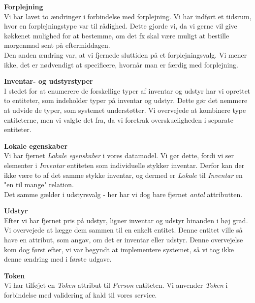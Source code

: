 \textbf{Forplejning}
\\Vi har lavet to ændringer i forbindelse med forplejning. Vi har indført et tidsrum, hvor en forplejningstype var til rådighed. Dette gjorde vi, da vi gerne vil give køkkenet mulighed for at bestemme, om det fx skal være muligt at bestille morgenmad sent på eftermiddagen.
\\Den anden ændring var, at vi fjernede sluttiden på et forplejningsvalg. Vi mener ikke, det er nødvendigt at specificere, hvornår man er færdig med forplejning.

\textbf{Inventar- og udstyrstyper}
\\I stedet for at enumerere de forskellige typer af inventar og udstyr har vi oprettet to entiteter, som indeholder typer på inventar og udstyr. Dette gør det nemmere at udvide de typer, som systemet understøtter. Vi overvejede at kombinere type entiteterne, men vi valgte det fra, da vi foretrak overskueligheden i separate entiteter.

\textbf{Lokale egenskaber}
\\Vi har fjernet \textit{Lokale egenskaber} i vores datamodel. Vi gør dette, fordi vi ser elementer i \textit{Inventar} entiteten som individuelle stykker inventar. Derfor kan der ikke være to af det samme stykke inventar, og dermed er \textit{Lokale} til \textit{Inventar} en "en til mange" relation.
\\Det samme gælder i udstyrsvalg - her har vi dog bare fjernet \textit{antal} attributten.

\textbf{Udstyr}
\\Efter vi har fjernet pris på udstyr, ligner inventar og udstyr hinanden i høj grad. Vi overvejede at lægge dem sammen til en enkelt entitet. Denne entitet ville så have en attribut, som angav, om det er inventar eller udstyr. Denne overvejelse kom dog først efter, vi var begyndt at implementere systemet, så vi tog ikke denne ændring med i første udgave.

\textbf{Token}
\\Vi har tilføjet en \textit{Token} attribut til \textit{Person} entiteten. Vi anvender \textit{Token} i forbindelse med validering af kald til vores service.